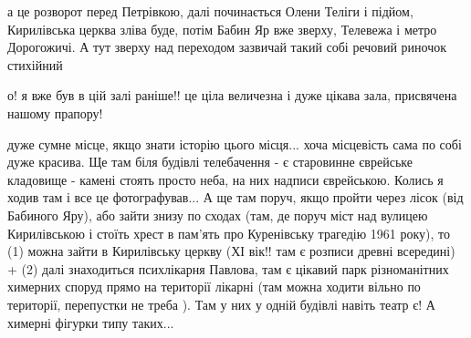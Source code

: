 










а це розворот перед Петрівкою, далі починається Олени Теліги і підйом,
Кирилівська церква зліва буде, потім Бабин Яр вже зверху, Телевежа і метро
Дорогожичі. А тут зверху над переходом зазвичай такий собі речовий риночок
стихійний

о! я вже був в цій залі раніше!! це ціла величезна і дуже цікава зала,
присвячена нашому прапору! 

дуже сумне місце, якщо знати історію цього місця... хоча місцевість сама по
собі дуже красива. Ще там біля будівлі телебачення - є старовинне єврейське
кладовище - камені стоять просто неба, на них надписи єврейською. 
Колись я ходив там і все це фотографував... А ще там поруч, якщо пройти через лісок (від Бабиного Яру),
або зайти знизу по сходах (там, де поруч міст над вулицею Кирилівською і стоїть
хрест в пам'ять про Куренівську трагедію 1961 року), то (1) можна зайти в
Кирилівську церкву (ХІ вік!! там є розписи древні всередині) + (2) далі
знаходиться психлікарня Павлова, там є цікавий парк різноманітних химерних
споруд прямо на території лікарні (там можна ходити вільно по території,
перепустки не треба ). Там у них у одній будівлі навіть театр є! А химерні
фігурки типу таких... 



